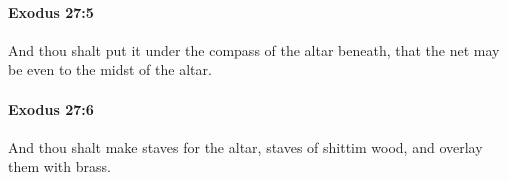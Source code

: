 		\paragraph{Exodus 27:5} %
			\label{EXODUS-27-5}

			And thou shalt put it under the compass of the altar beneath, that the net may be even to the midst of the altar.


		\paragraph{Exodus 27:6} %
			\label{EXODUS-27-6}

			And thou shalt make staves for the altar, staves of shittim wood, and overlay them with brass.


